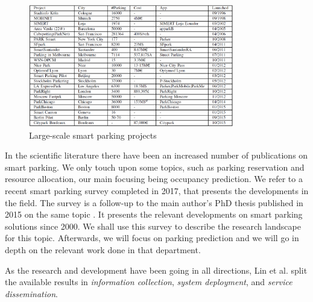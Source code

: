 \begin{figure}[!ht]
	\centering
	\includegraphics[width=0.8\textwidth]{graphics/related_work/smart_parking_projects.png}
	\caption{Large-scale smart parking projects} %
	\label{fig:smart_parking_projects}
\end{figure}

In the scientific literature there have been an increased number of publications on smart parking. We only touch upon some topics, such as parking reservation and resource allocation, our main focusing being occupancy prediction. We refer to a recent smart parking survey completed in 2017, that presents the developments in the field. The survey \cite{lin} is a follow-up to the main author's PhD thesis published in 2015 on the same topic \cite{lin2}. It presents the relevant developments on smart parking solutions since 2000. We shall use this survey to describe the research landscape for this topic. Afterwards, we will focus on parking prediction and we will go in depth on the relevant work done in that department. 

As the research and development have been going in all directions, Lin et al. split the available results in \textit{information collection}, \textit{system deployment}, and \textit{service dissemination}.

